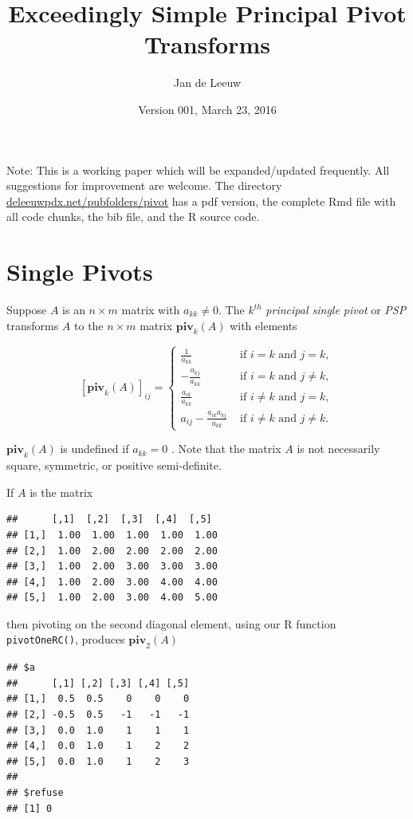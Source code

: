 \documentclass[12pt,]{article}
\title{Exceedingly Simple Principal Pivot Transforms}
\author{Jan de Leeuw}
\date{Version 001, March 23, 2016}
\begin{document}
\maketitle

{
\setcounter{tocdepth}{3}
\tableofcontents
}
Note: This is a working paper which will be expanded/updated frequently.
All suggestions for improvement are welcome. The directory
\href{http://deleeuwpdx.net/pubfolders/pivot}{deleeuwpdx.net/pubfolders/pivot}
has a pdf version, the complete Rmd file with all code chunks, the bib
file, and the R source code.

\section{Single Pivots}\label{single-pivots}

Suppose \(A\) is an \(n\times m\) matrix with \(a_{kk}\not= 0\). The
\(k^{th}\) \emph{principal single pivot} or \emph{PSP} transforms \(A\)
to the \(n\times m\) matrix \(\mathbf{piv}_k(A)\) with elements

\begin{equation}\label{E:pivot}
[\mathbf{piv}_k(A)]_{ij}=
\begin{cases}
\frac{1}{a_{kk}}&\text{ if }i=k\text{ and }j=k,\\
-\frac{a_{kj}}{a_{kk}}&\text{ if }i=k\text{ and }j\not=k,\\
\frac{a_{ik}}{a_{kk}}&\text{ if }i\not=k\text{ and }j=k,\\
a_{ij}-\frac{a_{ik}a_{kj}}{a_{kk}}&\text{ if }i\not=k\text{ and }j\not=k.
\end{cases}
\end{equation}

\(\mathbf{piv}_k(A)\) is undefined if \(a_{kk}=0\) . Note that the
matrix \(A\) is not necessarily square, symmetric, or positive
semi-definite.

If \(A\) is the matrix

\begin{verbatim}
##      [,1]  [,2]  [,3]  [,4]  [,5] 
## [1,]  1.00  1.00  1.00  1.00  1.00
## [2,]  1.00  2.00  2.00  2.00  2.00
## [3,]  1.00  2.00  3.00  3.00  3.00
## [4,]  1.00  2.00  3.00  4.00  4.00
## [5,]  1.00  2.00  3.00  4.00  5.00
\end{verbatim}

then pivoting on the second diagonal element, using our R function
\texttt{pivotOneRC()}, produces \(\mathbf{piv}_2(A)\)

\begin{verbatim}
## $a
##      [,1] [,2] [,3] [,4] [,5]
## [1,]  0.5  0.5    0    0    0
## [2,] -0.5  0.5   -1   -1   -1
## [3,]  0.0  1.0    1    1    1
## [4,]  0.0  1.0    1    2    2
## [5,]  0.0  1.0    1    2    3
## 
## $refuse
## [1] 0
\end{verbatim}
\end{document}

